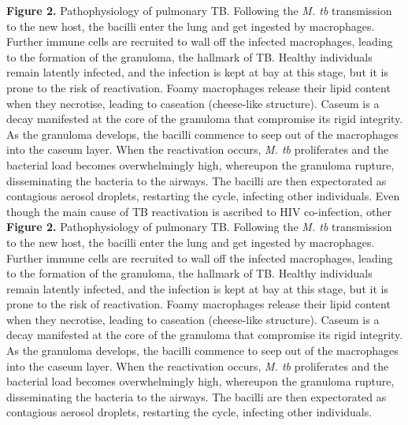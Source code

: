 \documentclass{article}
\begin{document}
\textbf{Figure 2.} Pathophysiology of pulmonary TB. Following the \textit{M. tb} transmission to the new host, the bacilli enter the lung and get ingested by macrophages. Further immune cells are recruited to wall off the infected macrophages, leading to the formation of the granuloma, the hallmark of TB. Healthy individuals remain latently infected, and the infection is kept at bay at this stage, but it is prone to the risk of reactivation. Foamy macrophages release their lipid content when they necrotise, leading to caseation (cheese-like structure). Caseum is a decay manifested at the core of the granuloma that compromise its rigid integrity. As the granuloma develops, the bacilli commence to seep out of the macrophages into the caseum layer. When the reactivation occurs, \textit{M. tb} proliferates and the bacterial load becomes overwhelmingly high, whereupon the granuloma rupture, disseminating the bacteria to the airways. The bacilli are then expectorated as contagious aerosol droplets, restarting the cycle, infecting other individuals. Even though the main cause of TB reactivation is ascribed to HIV co-infection, other \textbf{Figure 2.} Pathophysiology of pulmonary TB. Following the \textit{M. tb} transmission to the new host, the bacilli enter the lung and get ingested by macrophages. Further immune cells are recruited to wall off the infected macrophages, leading to the formation of the granuloma, the hallmark of TB. Healthy individuals remain latently infected, and the infection is kept at bay at this stage, but it is prone to the risk of reactivation. Foamy macrophages release their lipid content when they necrotise, leading to caseation (cheese-like structure). Caseum is a decay manifested at the core of the granuloma that compromise its rigid integrity. As the granuloma develops, the bacilli commence to seep out of the macrophages into the caseum layer. When the reactivation occurs, \textit{M. tb} proliferates and the bacterial load becomes overwhelmingly high, whereupon the granuloma rupture, disseminating the bacteria to the airways. The bacilli are then expectorated as contagious aerosol droplets, restarting the cycle, infecting other individuals.
\end{document}
